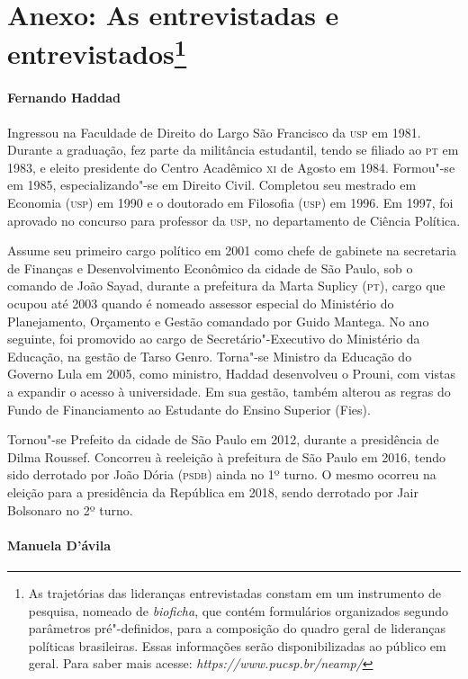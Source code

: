 \section{Anexo: As entrevistadas e entrevistados\protect\footnote{As
  trajetórias das lideranças entrevistadas constam em um instrumento de
  pesquisa, nomeado de \emph{bioficha}, que contém formulários
  organizados segundo parâmetros pré"-definidos, para a composição do
  quadro geral de lideranças políticas brasileiras. Essas informações
  serão disponibilizadas ao público em geral. Para saber mais acesse:
  \emph{https://www.pucsp.br/neamp/}}}

\paragraph{Fernando Haddad}

Ingressou na Faculdade de Direito do Largo São Francisco da \textsc{usp} em 1981.
Durante a graduação, fez parte da militância estudantil, tendo se
filiado ao \textsc{pt} em 1983, e eleito presidente do Centro Acadêmico \textsc{xi} de
Agosto em 1984. Formou"-se em 1985, especializando"-se em Direito Civil.
Completou seu mestrado em Economia (\textsc{usp}) em 1990 e o doutorado em
Filosofia (\textsc{usp}) em 1996. Em 1997, foi aprovado no concurso para
professor da \textsc{usp}, no departamento de Ciência Política.

Assume seu primeiro cargo político em 2001 como chefe de gabinete na
secretaria de Finanças e Desenvolvimento Econômico da cidade de São
Paulo, sob o comando de João Sayad, durante a prefeitura da Marta
Suplicy (\textsc{pt}), cargo que ocupou até 2003 quando é nomeado assessor
especial do Ministério do Planejamento, Orçamento e Gestão comandado por
Guido Mantega. No ano seguinte, foi promovido ao cargo de
Secretário"-Executivo do Ministério da Educação, na gestão de Tarso
Genro. Torna"-se Ministro da Educação do Governo Lula em 2005, como
ministro, Haddad desenvolveu o Prouni, com vistas a expandir o acesso à
universidade. Em sua gestão, também alterou as regras do Fundo de
Financiamento ao Estudante do Ensino Superior (Fies).

Tornou"-se Prefeito da cidade de São Paulo em 2012, durante a presidência
de Dilma Roussef. Concorreu à reeleição à prefeitura de São Paulo em
2016, tendo sido derrotado por João Dória (\textsc{psdb}) ainda no 1º turno. O
mesmo ocorreu na eleição para a presidência da República em 2018, sendo
derrotado por Jair Bolsonaro no 2º turno.

\paragraph{Manuela D'ávila}

